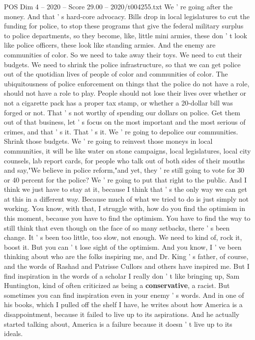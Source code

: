 \begin{textsample}{POS Dim 4 – 2020 – Score 29.00 – 2020/t004255.txt}
We ' re going after the money.
And that ' s hard-core advocacy.
Bills drop in local legislatures to cut the funding for police, to stop these programs that give the federal military surplus to police departments, so they become, like, little mini armies, these don ' t look like police officers, these look like standing armies.
And the enemy are communities of color.
So we need to take away their toys.
We need to cut their budgets.
We need to shrink the police infrastructure, so that we can get police out of the quotidian lives of people of color and communities of color.
The ubiquitousness of police enforcement on things that the police do not have a role, should not have a role to play.
People should not lose their lives over whether or not a cigarette pack has a proper tax stamp, or whether a 20-dollar bill was forged or not.
That ' s not worthy of spending our dollars on police.
Get them out of that business, let ' s focus on the most important and the most serious of crimes, and that ' s it.
That ' s it.
We ' re going to depolice our communities.
Shrink those budgets.
We ' re going to reinvest those moneys in local communities, it will be like water on stone campaigns, local legislatures, local city counsels, lab report cards, for people who talk out of both sides of their mouths and say,"We believe in police reform,"and yet, they ' re still going to vote for 30 or 40 percent for the police?
We ' re going to put that right to the public.
And I think we just have to stay at it, because I think that ' s the only way we can get at this in a different way.
Because much of what we tried to do is just simply not working.
You know, with that, I struggle with, how do you find the optimism in this moment, because you have to find the optimism.
You have to find the way to still think that even though on the face of so many setbacks, there ' s been change.
It ' s been too little, too slow, not enough.
We need to kind of, rock it, boost it.
But you can ' t lose sight of the optimism.
And you know, I ' ve been thinking about who are the folks inspiring me, and Dr.
King ' s father, of course, and the words of Rashad and Patrisse Cullors and others have inspired me.
But I find inspiration in the words of a scholar I really don ' t like bringing up, Sam Huntington, kind of often criticized as being a \textbf{conservative}, a racist.
But sometimes you can find inspiration even in your enemy ' s words.
And in one of his books, which I pulled off the shelf I have, he writes about how America is a disappointment, because it failed to live up to its aspirations.
And he actually started talking about, America is a failure because it doesn ' t live up to its ideals.

\end{textsample}
